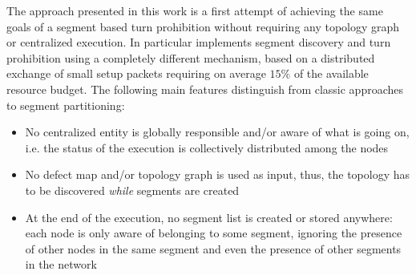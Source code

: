 The \disr{} approach presented in this work is a first attempt of
achieving the same goals of a segment based turn prohibition  without
requiring any topology graph or centralized execution. In particular
\disr{} implements segment discovery and turn prohibition using a
completely different mechanism, based on a distributed exchange of
small setup packets requiring on average $15\%$ of the available
resource budget. The following main features distinguish \disr{}
from classic approaches to segment partitioning: 
\begin{itemize}
\item No centralized entity is globally responsible and/or aware of
what is going on, i.e. the status of the \disr{} execution is
collectively distributed among the nodes
\item  No defect map and/or topology graph is used as input,
thus, the topology has to be discovered \emph{while} segments are
created
\item At the end of the execution, no segment list is created or
stored anywhere: each node is only aware of belonging to some segment,
ignoring the presence of other nodes in the same segment and even the
presence of other segments in the network
\end{itemize}


